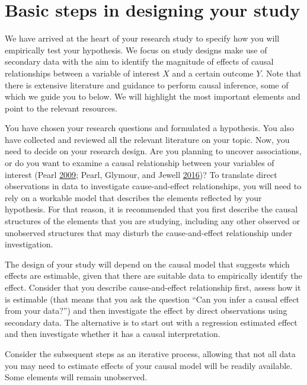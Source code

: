 \documentclass[
]{book}
\begin{document}
\hypertarget{basic-steps-in-designing-your-study}{%
\section{Basic steps in designing your
study}\label{basic-steps-in-designing-your-study}}

We have arrived at the heart of your research study to specify how you
will empirically test your hypothesis. We focus on study designs make
use of secondary data with the aim to identify the magnitude of effects
of causal relationships between a variable of interest \(X\) and a
certain outcome \(Y\). Note that there is extensive literature and
guidance to perform causal inference, some of which we guide you to
below. We will highlight the most important elements and point to the
relevant resources.

You have chosen your research questions and formulated a hypothesis. You
also have collected and reviewed all the relevant literature on your
topic. Now, you need to decide on your research design. Are you planning
to uncover associations, or do you want to examine a causal relationship
between your variables of interest (Pearl
\protect\hyperlink{ref-pearl_causality_2009}{2009}; Pearl, Glymour, and
Jewell \protect\hyperlink{ref-pearl_causal_2016}{2016})? To translate
direct observations in data to investigate cause-and-effect
relationships, you will need to rely on a workable model that describes
the elements reflected by your hypothesis. For that reason, it is
recommended that you first describe the causal structures of the
elements that you are studying, including any other observed or
unobserved structures that may disturb the cause-and-effect relationship
under investigation.

The design of your study will depend on the causal model that suggests
which effects are estimable, given that there are suitable data to
empirically identify the effect. Consider that you describe
cause-and-effect relationship first, assess how it is estimable (that
means that you ask the question ``Can you infer a causal effect from
your data?'') and then investigate the effect by direct observations
using secondary data. The alternative is to start out with a regression
estimated effect and then investigate whether it has a causal
interpretation.

Consider the subsequent steps as an iterative process, allowing that not
all data you may need to estimate effects of your causal model will be
readily available. Some elements will remain unobserved.
\end{document}
